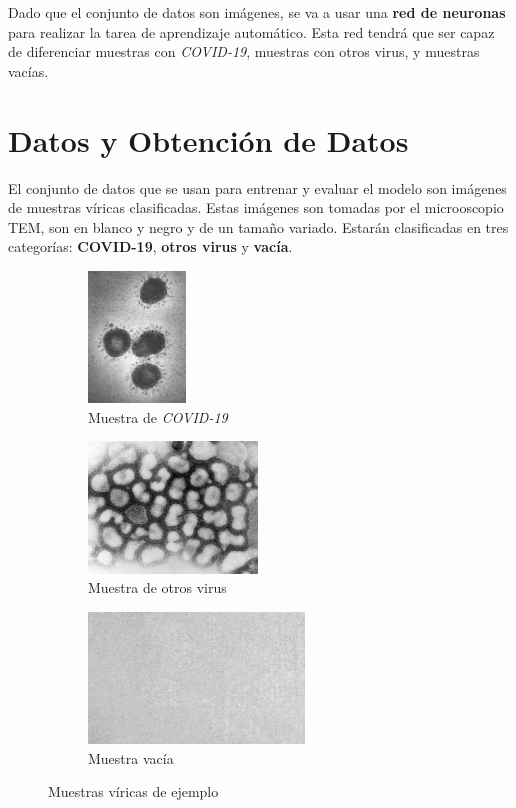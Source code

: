 \documentclass{uc3mpracticas}
\begin{document}
  \vspace{2mm}

  Dado que el conjunto de datos son imágenes, se va a usar una \textbf{red de neuronas} para realizar la tarea de aprendizaje automático. Esta red tendrá que ser capaz de diferenciar muestras con \textit{COVID-19}, muestras con otros virus, y muestras vacías.

  \newpage

  \section{Datos y Obtención de Datos}

  El conjunto de datos que se usan para entrenar y evaluar el modelo son imágenes de muestras víricas clasificadas. Estas imágenes son tomadas por el microoscopio TEM, son en blanco y negro y de un tamaño variado. Estarán clasificadas en tres categorías: \textbf{COVID-19}, \textbf{otros virus} y \textbf{vacía}.

  \vspace{5mm}

  \begin{figure}[!h]
    \centering
    \begin{subfigure}[b]{0.3\textwidth}
      \includegraphics[angle=90, width=\textwidth, height=35mm, frame]{Images/coronaviridae/coronaviridae_0001.jpg}
      \caption{Muestra de \textit{COVID-19}}
    \end{subfigure}
    \hfill
    \begin{subfigure}[b]{0.3\textwidth}
      \includegraphics[width=\textwidth, height=35mm, frame]{Images/other/other_0021.jpg}
      \caption{Muestra de otros virus}
    \end{subfigure}
    \hfill
    \begin{subfigure}[b]{0.3\textwidth}
      \includegraphics[width=\textwidth, height=35mm, frame]{Images/blank/blank_0019.jpg}
      \caption{Muestra vacía}
    \end{subfigure}

    \caption{Muestras víricas de ejemplo}
  \end{figure}
\end{document}
